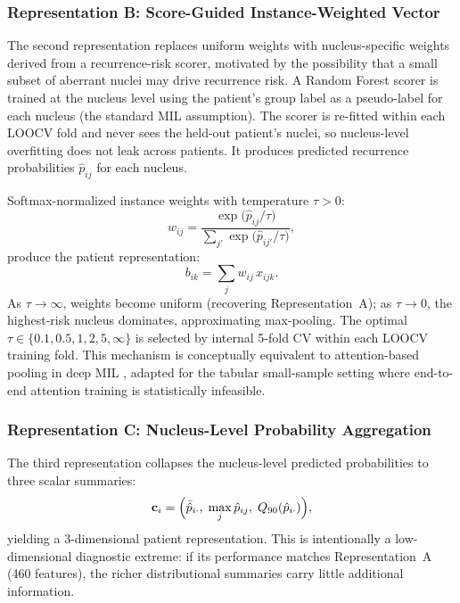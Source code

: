 \documentclass[12pt, onecolumn]{article}
\begin{document}
\subsubsection{Representation B: Score-Guided Instance-Weighted Vector}

The second representation replaces uniform weights with
nucleus-specific weights derived from a recurrence-risk scorer, motivated by the possibility that a small subset of aberrant nuclei may drive recurrence risk. A Random Forest scorer is trained at the nucleus level using the patient's group label as a pseudo-label for each nucleus (the standard MIL assumption).
The scorer is re-fitted within each LOOCV fold and never sees the held-out patient's nuclei, so nucleus-level overfitting does not leak across patients. It produces predicted recurrence probabilities $\hat{p}_{ij}$ for each nucleus.

Softmax-normalized instance weights with temperature $\tau > 0$:
\begin{equation}
  w_{ij} =
  \frac{\exp\!\bigl(\hat{p}_{ij}/\tau\bigr)}
       {\sum_{j'}\exp\!\bigl(\hat{p}_{ij'}/\tau\bigr)},
  \label{eq:softmax}
\end{equation}
produce the patient representation:
\begin{equation}
  b_{ik} = \sum_{j} w_{ij}\, x_{ijk}.
  \label{eq:repB}
\end{equation}
As $\tau \to \infty$, weights become uniform (recovering
Representation~A); as $\tau \to 0$, the highest-risk nucleus
dominates, approximating max-pooling. The optimal $\tau \in
\{0.1, 0.5, 1, 2, 5, \infty\}$ is selected by internal 5-fold
CV within each LOOCV training fold. This mechanism is
conceptually equivalent to attention-based pooling in deep MIL
\citep{ilse2018}, adapted for the tabular small-sample setting where end-to-end attention training is statistically infeasible.

\subsubsection{Representation C: Nucleus-Level Probability Aggregation}

The third representation collapses the nucleus-level predicted probabilities to three scalar summaries:
\begin{equation}
  \mathbf{c}_i =
  \Bigl(
    \bar{\hat{p}}_{i\cdot},\;
    \max_j \hat{p}_{ij},\;
    Q_{90}(\hat{p}_{i\cdot})
  \Bigr),
  \label{eq:repC}
\end{equation}
yielding a 3-dimensional patient representation. This is intentionally a low-dimensional diagnostic extreme: if its performance matches Representation~A (460 features), the richer distributional summaries carry little additional information.
\end{document}
